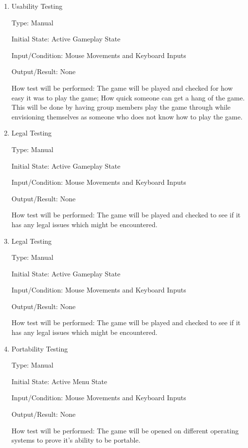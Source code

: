 \documentclass[12pt, titlepage]{article}
\begin{document}
\begin{enumerate}

\item{Usability Testing\\}

Type: Manual
					
Initial State: Active Gameplay State
					
Input/Condition: Mouse Movements and Keyboard Inputs
					
Output/Result: None
					
How test will be performed: The game will be played and checked for how easy it was to play the game; How quick someone can get a hang of the game. This will be done by having group members play the game through while envisioning themselves as someone who does not know how to play the game. 
					
\item{Legal Testing\\}

Type: Manual
					
Initial State: Active Gameplay State
					
Input/Condition: Mouse Movements and Keyboard Inputs
					
Output/Result: None
					
How test will be performed: The game will be played and checked to see if it has any legal issues which might be encountered. 

\item{Legal Testing\\}

Type: Manual
					
Initial State: Active Gameplay State
					
Input/Condition: Mouse Movements and Keyboard Inputs
					
Output/Result: None
					
How test will be performed: The game will be played and checked to see if it has any legal issues which might be encountered. 

\item{Portability Testing\\}

Type: Manual
					
Initial State: Active Menu State
					
Input/Condition: Mouse Movements and Keyboard Inputs
					
Output/Result: None
					
How test will be performed: The game will be opened on different operating systems to prove it's ability to be portable. 

\end{enumerate}
\end{document}
